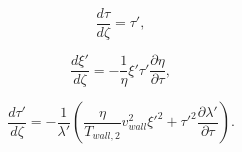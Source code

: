 \documentclass[12pt]{article}
\begin{document}
\begin{equation}
  \frac{d \tau}{d \zeta} = \tau',
\end{equation}

\begin{equation}
  \frac{d \xi'}{d \zeta} = -\frac{1}{\eta}\xi'\tau'\frac{\partial \eta}{\partial \tau},\label{eqn-dimensionless-dx21}
\end{equation}

\begin{equation}
  \frac{d \tau'}{d \zeta} = -\frac{1}{\lambda'}\left(\frac{\eta}{T_{wall,2}}v_{wall}^{2}\xi'^{2}+\tau'^{2}\frac{\partial \lambda'}{\partial \tau} \right).
\end{equation}









\end{document}
